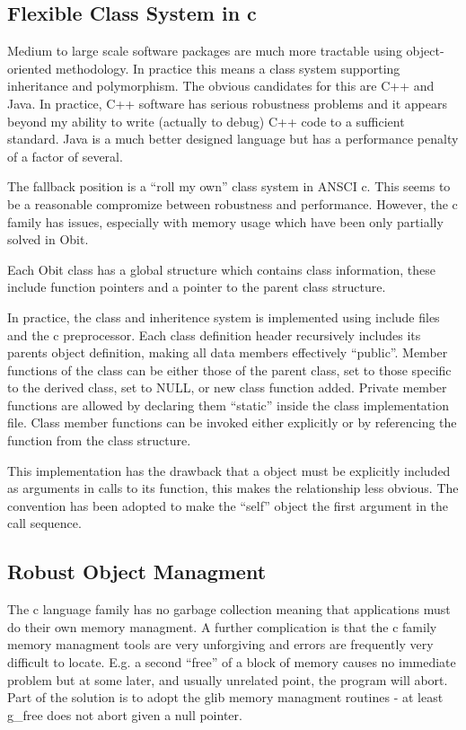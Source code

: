 \documentclass[11pt]{article}
\begin{document}
\subsection{Flexible Class System in c}
Medium to large scale software packages are much more tractable using
object-oriented methodology.
In practice this means a class system supporting inheritance and
polymorphism.
The obvious candidates for this are C++ and Java.
In practice, C++ software has serious robustness problems and it
appears beyond my ability to write (actually to debug) C++ code to a
sufficient standard.
Java is a much better designed language but has a performance penalty
of a factor of several.

   The fallback position is a ``roll my own'' class system in ANSCI
c.
This seems to be a reasonable compromize between robustness and
performance.
However, the c family has issues, especially with memory usage which
have been only partially solved in Obit.

Each Obit class has a global structure which contains class information,
these include function pointers and a pointer to the parent class
structure.

In practice, the class and inheritence system is implemented using
include files and the c preprocessor.
Each class definition header recursively includes its parents object
definition, making all data members effectively ``public''.
Member functions of the class can be either those of the parent
class, set to those specific to the derived class, set to NULL, or new
class function added.
Private member functions are allowed by declaring them ``static''
inside the class implementation file.
Class member functions can be invoked either explicitly or by
referencing the function from the class structure.

This implementation has the drawback that a object must be explicitly
included as arguments in calls to its function, this makes the
relationship less obvious.
The convention has been adopted to make the ``self'' object the first
argument in the call sequence.

\subsection{Robust Object Managment}
The c language family has no garbage collection meaning that
applications must do their own memory managment.
A further complication is that the c family memory managment tools are
very unforgiving and errors are frequently very difficult to locate.
E.g. a second ``free'' of a block of memory causes no immediate
problem but at some later, and usually unrelated point, the program
will abort.  Part of the solution is to adopt the glib memory
managment routines - at least g\_free does not abort given a null
pointer.
\end{document}
